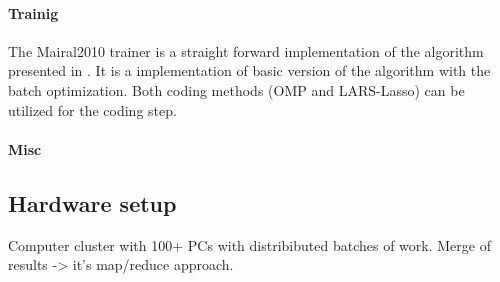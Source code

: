 \paragraph{Trainig}
The Mairal2010 trainer is a straight forward implementation of the algorithm presented in \cite{Mairal2010}.
It is a implementation of basic version of the algorithm with the batch optimization. 
Both coding methods (OMP and LARS-Lasso) can be utilized for the coding step.

\paragraph{Misc}


\subsection*{Hardware setup}
Computer cluster with 100+ PCs with distribibuted batches of work.
Merge of results -> it's  map/reduce approach.


